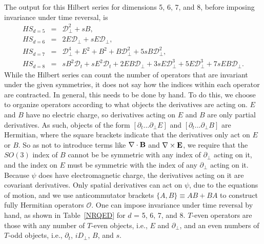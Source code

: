 \documentclass[prd,onecolumn, nofootinbib, 11pt]{revtex4}
\begin{document}
The output for this Hilbert series for dimensions 5, 6, 7, and 8, before imposing invariance under time reversal, is
%
\begin{eqnarray}
HS_{d=5} &=& \mathcal{D}_\perp^2 + sB , \\
HS_{d=6} &=& 2E\mathcal{D}_\perp + sE\mathcal{D}_\perp ,  \\
HS_{d=7} &=& \mathcal{D}_\perp^4 + E^2 + B^2 + B \mathcal{D}_\perp^2 + 5 sB\mathcal{D}_\perp^2 , \\
HS_{d=8} &=& sB^2 \mathcal{D}_t + sE^2 \mathcal{D}_t + 2EB\mathcal{D}_\perp + 3sE\mathcal{D}_\perp^3 + 5E\mathcal{D}_\perp^3+ 7 sEB\mathcal{D}_\perp .
\end{eqnarray}
%
While the Hilbert series can count the number of operators that are invariant under the given symmetries, it does not say how the indices within each operator are contracted.  In general, this needs to be done by hand.  
To do this, we choose to organize operators according to what objects the derivatives are acting on. 
$E$ and $B$ have no electric charge, so derivatives acting on $E$ and $B$ are only partial derivatives.  
As such, objects of the form $[\partial_t ... \partial_\perp E]$ and $[\partial_t ... \partial_\perp B]$ are Hermitian, where the square brackets indicate that the derivatives only act on $E$ or $B$. 
So as not to introduce terms like $\nabla \cdot {\bf B}$ and $\nabla \times {\bf E}$, we require that the $SO(3)$ index of $B$ cannot be be symmetric with any index of $\partial_\perp$  acting on it, and the index on $E$ must be symmetric with the index of any $\partial_\perp$ acting on it.  
Because $\psi$ does have electromagnetic charge, the derivatives acting on it are covariant derivatives.  Only spatial derivatives can act on $\psi$, due to the equations of motion, and we use anticommutator brackets $\{A,B\}\equiv AB + BA$ to construct fully Hermitian operators $\mathcal{O}$. 
%
One can impose invariance under time reversal by hand, as shown in Table~\ref{NRQED} for $d$ = 5, 6, 7, and 8.   $T$-even operators are those with any number of $T$-even objects, i.e., $E$ and $\partial_\perp$, and an even numbers of $T$-odd objects, i.e., $\partial_t$, $iD_\perp$, $B$, and $s$. 
\end{document}
